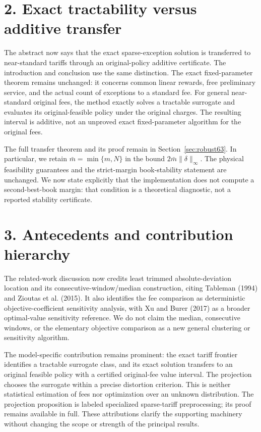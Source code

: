 \documentclass[11pt,letterpaper]{article}
\theoremstyle{definition}\newtheorem{remark}[theorem]{Remark}
\begin{document}
\section*{2. Exact tractability versus additive transfer}
The abstract now says that the exact sparse-exception solution is transferred to near-standard tariffs through an original-policy additive certificate. The introduction and conclusion use the same distinction. The exact fixed-parameter theorem remains unchanged: it concerns common linear rewards, free preliminary service, and the actual count of exceptions to a standard fee. For general near-standard original fees, the method exactly solves a tractable surrogate and evaluates its original-feasible policy under the original charges. The resulting interval is additive, not an unproved exact fixed-parameter algorithm for the original fees.

The full transfer theorem and its proof remain in Section~\ref{sec:robust63}. In particular, we retain $\bar m=\min\{m,N\}$ in the bound $2\bar m\|\delta\|_\infty$. The physical feasibility guarantees and the strict-margin book-stability statement are unchanged. We now state explicitly that the implementation does not compute a second-best-book margin: that condition is a theoretical diagnostic, not a reported stability certificate.

\section*{3. Antecedents and contribution hierarchy}
The related-work discussion now credits least trimmed absolute-deviation location and its consecutive-window/median construction, citing Tableman (1994) and Zioutas et al. (2015). It also identifies the fee comparison as deterministic objective-coefficient sensitivity analysis, with Xu and Burer (2017) as a broader optimal-value sensitivity reference. We do not claim the median, consecutive windows, or the elementary objective comparison as a new general clustering or sensitivity algorithm.

The model-specific contribution remains prominent: the exact tariff frontier identifies a tractable surrogate class, and its exact solution transfers to an original feasible policy with a certified original-fee value interval. The projection chooses the surrogate within a precise distortion criterion. This is neither statistical estimation of fees nor optimization over an unknown distribution. The projection proposition is labeled specialized sparse-tariff preprocessing; its proof remains available in full. These attributions clarify the supporting machinery without changing the scope or strength of the principal results.
\end{document}
